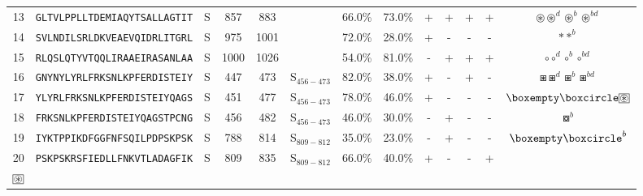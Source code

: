 \begin{tabular}{rcccccccccccc}
13 &  \texttt{GLTVLPPLLTDEMIAQYTSALLAGTIT} &       S &    857 &   883 &                &                          66.0\% &                           73.0\% &          + &           + &          + &           + &                                                                                   $ \circledast \circledast^d \circledast^b \circledast^{bd} $ \\
14 &  \texttt{SVLNDILSRLDKVEAEVQIDRLITGRL} &       S &    975 &  1001 &                &                          72.0\% &                           28.0\% &          + &           - &          - &           - &                                                                                                                                $ \ast \ast^b $ \\
15 &  \texttt{RLQSLQTYVTQQLIRAAEIRASANLAA} &       S &   1000 &  1026 &                &                          54.0\% &                           81.0\% &          - &           + &          + &           + &                                                                                                           $ \circ \circ^d \circ^b \circ^{bd} $ \\
16 &  \texttt{GNYNYLYRLFRKSNLKPFERDISTEIY} &       S &    447 &   473 &  S$_{456-473}$ &                          82.0\% &                           38.0\% &          + &           - &          + &           - &                                                                                                   $ \boxast \boxast^d \boxast^b \boxast^{bd} $ \\
17 &  \texttt{YLYRLFRKSNLKPFERDISTEIYQAGS} &       S &    451 &   477 &  S$_{456-473}$ &                          78.0\% &                           46.0\% &          + &           - &          - &           - &                                                                       $ \boxempty \boxcircle \setlength{\fboxsep}{0.5pt} \boxed{\circledast} $ \\
18 &  \texttt{FRKSNLKPFERDISTEIYQAGSTPCNG} &       S &    456 &   482 &  S$_{456-473}$ &                          46.0\% &                           30.0\% &          - &           + &          - &           - &                                                                                                                               $ \boxcircle^b $ \\
19 &  \texttt{IYKTPPIKDFGGFNFSQILPDPSKPSK} &       S &    788 &   814 &  S$_{809-812}$ &                          35.0\% &                           23.0\% &          - &           + &          - &           - &                                                                                                                     $ \boxempty \boxcircle^b $ \\
20 &  \texttt{PSKPSKRSFIEDLLFNKVTLADAGFIK} &       S &    809 &   835 &  S$_{809-812}$ &                          66.0\% &                           40.0\% &          + &           - &          - &           + &                             \Centerstack{  $\boxast \boxast^b \boxcircle \boxcircle^d$ \\  $\setlength{\fboxsep}{0.5pt} \boxed{\circledast}$ } \\
\bottomrule
\end{tabular}

